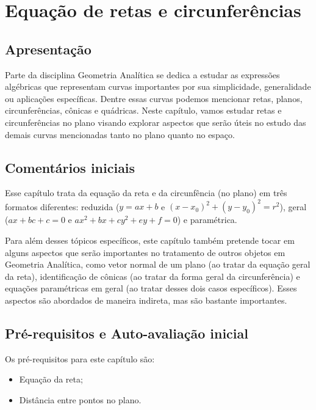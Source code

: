\documentclass[main.tex]{subfiles}
\begin{document}
\paraAmbos

\chapter{Equação de retas e circunferências}

\section{Apresentação}

Parte da disciplina Geometria Analítica se dedica a estudar as expressões algébricas que representam curvas importantes por sua simplicidade, generalidade ou aplicações específicas. Dentre essas curvas podemos mencionar retas, planos, circunferências, cônicas e quádricas. Neste capítulo, vamos estudar retas e circunferências no plano visando explorar aspectos que serão úteis no estudo das demais curvas mencionadas tanto no plano quanto no espaço.

\paraTutores

\section{Comentários iniciais}

Esse capítulo trata da equação da reta e da circunfência (no plano) em três formatos diferentes: reduzida ($y=ax+b$ e $(x-x_0)^2+(y-y_0)^2=r^2$), geral ($ax+bc+c=0$ e $ax^2+bx+cy^2+ey+f=0$) e paramétrica.

Para além desses tópicos específicos, este capítulo também pretende tocar em alguns aspectos que serão importantes no tratamento de outros objetos em Geometria Analítica, como vetor normal de um plano (ao tratar da equação geral da reta), identificação de cônicas (ao tratar da forma geral da circunferência) e equações paramétricas em geral (ao tratar desses dois casos específicos). Esses aspectos são abordados de maneira indireta, mas são bastante importantes.

\paraAmbos

\section{Pré-requisitos e Auto-avaliação inicial}

Os pré-requisitos para este capítulo são:
\begin{itemize}
 \item Equação da reta;
 \item Distância entre pontos no plano.
\end{itemize}
\end{document}
